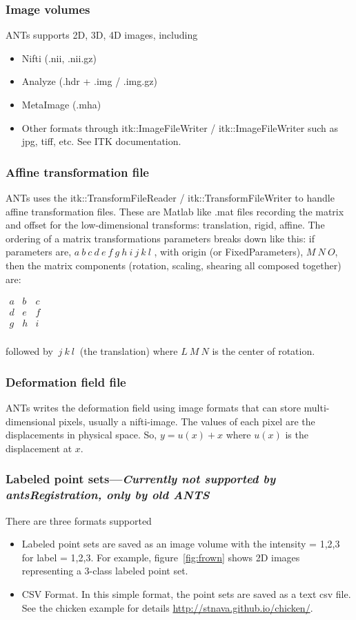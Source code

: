 \documentclass{InsightArticle}
\begin{document}
\subsubsection{Image volumes}
ANTs supports 2D, 3D, 4D images, including
\begin{itemize}
\item Nifti (.nii, .nii.gz)
\item Analyze (.hdr + .img / .img.gz)
\item MetaImage (.mha)
\item Other formats through itk::ImageFileWriter / itk::ImageFileWriter such as jpg, tiff, etc.  See ITK documentation. 
\end{itemize}
\subsubsection{Affine transformation file}
ANTs uses the itk::TransformFileReader / itk::TransformFileWriter to handle affine transformation files. 
These are Matlab like .mat files recording the matrix and offset for
the low-dimensional transforms: translation, rigid, affine.
The ordering of a matrix transformations parameters breaks down like
this: if parameters are,  $ a~b~c~d~e~f~g~h~i~j~k~l $ , with origin
(or FixedParameters), $ M~N~O $, then the matrix components (rotation,
scaling, shearing all composed together) are:

$ \begin{matrix}
a & b & c \\
d & e & f  \\
g & h & i \\ 
\end{matrix} $

followed by  $~j~k~l~$ (the translation) where $L~M~N$  is the center
of rotation.

\subsubsection{Deformation field file}
ANTs writes the deformation field using image formats that can store
multi-dimensional pixels, usually a nifti-image.  The values of each
pixel are the displacements in physical space.   So, $y=u(x)+x$ where
$u(x)$ is the displacement at $x$.

\subsubsection{Labeled point sets---\textit{Currently not supported by
  antsRegistration, only by old ANTS}}
There are three formats supported
\begin{itemize}
\item  Labeled point sets are saved as an image volume with the intensity = 1,2,3 for label = 1,2,3. For example, 
figure~\ref{fig:frown} shows 2D images representing a 3-class labeled point set. 
\item CSV Format. In this simple format, the point sets are saved as a
  text csv file.  See the chicken example for details \href{http://stnava.github.io/chicken/}{http://stnava.github.io/chicken/}.
\end{itemize}
\end{document}
